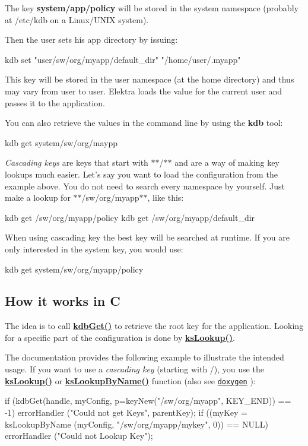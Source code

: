 The key {\bfseries system/app/policy} will be stored in the system namespace (probably at /etc/kdb on a Linux/\+U\+N\+I\+X system).

Then the user sets his app directory by issuing\+: \begin{DoxyVerb}    kdb set "user/sw/org/myapp/default_dir" "/home/user/.myapp"
\end{DoxyVerb}


This key will be stored in the user namespace (at the home directory) and thus may vary from user to user. Elektra loads the value for the current user and passes it to the application.

You can also retrieve the values in the command line by using the {\bfseries kdb} tool\+: \begin{DoxyVerb}    kdb get system/sw/org/maypp
\end{DoxyVerb}


{\itshape Cascading keys} are keys that start with $\ast$$\ast$/$\ast$$\ast$ and are a way of making key lookups much easier. Let's say you want to load the configuration from the example above. You do not need to search every namespace by yourself. Just make a lookup for $\ast$$\ast$/sw/org/myapp$\ast$$\ast$, like this\+: \begin{DoxyVerb}    kdb get /sw/org/myapp/policy
    kdb get /sw/org/myapp/default_dir
\end{DoxyVerb}


When using cascading key the best key will be searched at runtime. If you are only interested in the system key, you would use\+: \begin{DoxyVerb}    kdb get system/sw/org/myapp/policy
\end{DoxyVerb}


\subsection*{How it works in C}

The idea is to call {\bfseries \hyperlink{group__kdb_ga28e385fd9cb7ccfe0b2f1ed2f62453a1}{kdb\+Get()}} to retrieve the root key for the application. Looking for a specific part of the configuration is done by {\bfseries \hyperlink{group__keyset_gaa34fc43a081e6b01e4120daa6c112004}{ks\+Lookup()}}.

The documentation provides the following example to illustrate the intended usage. If you want to use a {\itshape cascading key} (starting with /), you use the {\bfseries \hyperlink{group__keyset_gaa34fc43a081e6b01e4120daa6c112004}{ks\+Lookup()}} or {\bfseries \hyperlink{group__keyset_gad2e30fb6d4739d917c5abb2ac2f9c1a1}{ks\+Lookup\+By\+Name()}} function (also see \href{http://doc.libelektra.org/api/current/html/group__keyset.html#gaa34fc43a081e6b01e4120daa6c112004}{\tt doxygen} )\+: \begin{DoxyVerb}    if (kdbGet(handle, myConfig,  p=keyNew("/sw/org/myapp", KEY_END)) == -1)
            errorHandler ("Could not get Keys", parentKey);
    if ((myKey = ksLookupByName (myConfig, "/sw/org/myapp/mykey", 0)) == NULL)
            errorHandler ("Could not Lookup Key");\end{DoxyVerb}
 